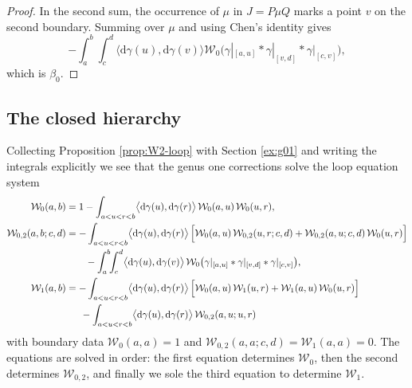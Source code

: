 \documentclass[11pt,a4paper]{article}
\newcommand{\cW}{\mathcal{W}}
\newcommand{\dd}{\mathrm{d}}
\begin{document}
\begin{proof}
In the second sum, the occurrence of $\mu$ in $J=P\mu Q$ marks a point $v$ on the second boundary. Summing over $\mu$ and using Chen's identity gives
\begin{equation}
-\int_a^b\!\!\int_c^d \bigl\langle\dd\gamma(u),\dd\gamma(v)\bigr\rangle \cW_0\bigl( \gamma|_{[a,u]}* \gamma|_{[v,d]}*\gamma|_{[c,v]} \bigr),
\end{equation}
which is $\beta_0$. 
\end{proof}



\subsection{The closed hierarchy}


Collecting Proposition \ref{prop:W2-loop} with Section \ref{ex:g01} and writing the integrals explicitly we see that the genus one corrections solve the loop equation system
\begin{align}
  \cW_0(a,b) &= 1 - \int_{a<u<r<b}\bigl\langle\dd\gamma(u),\dd\gamma(r)\bigr\rangle\, \cW_0(a,u)\,\cW_0(u,r), \label{eq:int-0-app}\\
    \cW_{0,2}(a,b;c,d) &= -\int_{a<u<r<b}\bigl\langle\dd\gamma(u),\dd\gamma(r)\bigr\rangle\, \Bigl[\cW_0(a,u)\,\cW_{0,2}(u,r;c,d) + \cW_{0,2}(a,u;c,d)\,\cW_0(u,r)\Bigr] \notag\\
  &\qquad -\int_a^b\!\!\int_c^d\bigl\langle\dd\gamma(u),\dd\gamma(v)\bigr\rangle\,\cW_0\bigl(\gamma|_{[a,u]}*\gamma|_{[v,d]}*\gamma|_{[c,v]}\bigr), \label{eq:int-2}\\
  \cW_1(a,b) &= -\int_{a<u<r<b}\bigl\langle\dd\gamma(u),\dd\gamma(r)\bigr\rangle\, \Bigl[\cW_0(a,u)\,\cW_1(u,r) + \cW_1(a,u)\,\cW_0(u,r)\Bigr]\nonumber\\
  & \hspace{15pt}-\int_{a<u<r<b}\bigl\langle\dd\gamma(u),\dd\gamma(r)\bigr\rangle\, \cW_{0,2}(a,u;u,r)\label{eq:int-1-app}
\end{align}
with boundary data $\cW_0(a,a)=1$ and $\cW_{0,2}(a,a;c,d)=\cW_1(a,a)=0$. The equations are solved in order: the first equation determines $\cW_0$, then the second determines $\cW_{0,2}$, and finally we sole the third equation to determine $\cW_1$.





\end{document}
